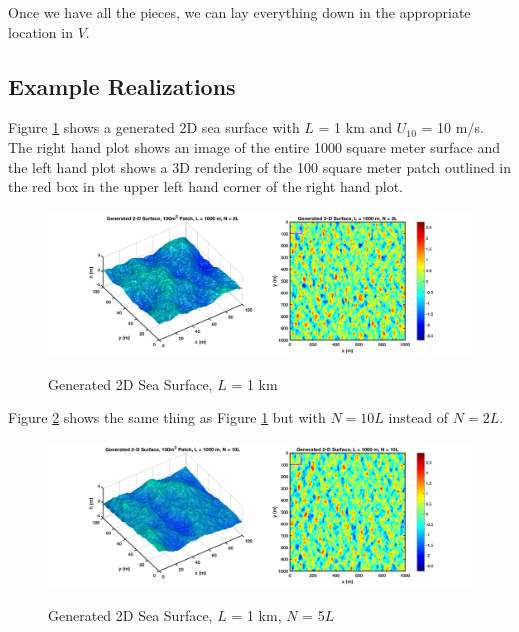 Once we have all the pieces, we can lay everything down in the appropriate location in $V$.

\subsection{Example Realizations}
Figure \ref{os_fig:8} shows a generated 2D sea surface with $L$ = 1 km and $U_{10}$ = 10 m/s. The right hand plot shows an image of the entire 1000 square meter surface and the left hand plot shows a 3D rendering of the 100 square meter patch outlined in the red box in the upper left hand corner of the right hand plot.
\begin{figure}[H]
  \begin{center}
\includegraphics[width=6in]{../media/Ocean_Surface/sea_surface_2d_surf_1000.png}
  \end{center}
  \renewcommand{\baselinestretch}{1} \small\normalsize
  \begin{quote}
    \caption[Generated 2D Sea Surface, $L$ = 1 km]{Generated 2D Sea Surface, $L$ = 1 km \label{os_fig:8}}
  \end{quote}
\end{figure}
\renewcommand{\baselinestretch}{2} \small\normalsize

Figure \ref{os_fig:8a} shows the same thing as Figure \ref{os_fig:8} but with $N=10L$ instead of $N = 2L$.
\begin{figure}[H]
  \begin{center}
\includegraphics[width=6in]{../media/Ocean_Surface/sea_surface_2d_surf_1000_10.png}
  \end{center}
  \renewcommand{\baselinestretch}{1} \small\normalsize
  \begin{quote}
    \caption[Generated 2D Sea Surface, $L$ = 1 km, $N$ = 5$L$]{Generated 2D Sea Surface, $L$ = 1 km, $N$ = 5$L$ \label{os_fig:8a}}
  \end{quote}
\end{figure}
\renewcommand{\baselinestretch}{2} \small\normalsize

